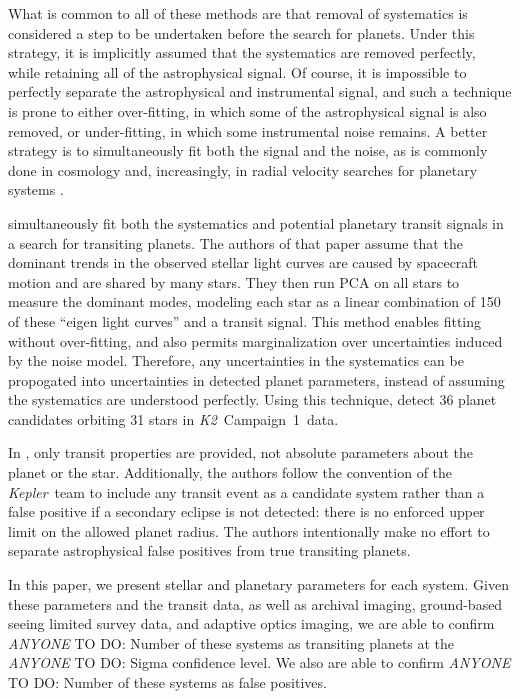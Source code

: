 \documentclass{emulateapj}
\newcommand{\project}[1]{\textsl{#1}}
\newcommand{\kep}{\project{Kepler}}
\newcommand{\KT}{\project{K2}}
\newcommand{\Ci}{Campaign~1}
\newcommand{\paperit}{\citet{Foreman-Mackey15}}
\newcommand{\todo}[3]{{\color{#2} \emph{#1} TO DO: #3}}
\newcommand{\anytodo}[1]{\todo{ANYONE}{NavyBlue}{#1}}
\begin{document}
What is common to all of these methods are that removal of systematics is considered a
step to be undertaken before the search for planets.
Under this strategy, it is implicitly assumed that the systematics are removed perfectly,
while retaining all of the astrophysical signal.
Of course, it is impossible to perfectly separate the astrophysical and instrumental
signal, and such a technique is prone to either over-fitting, in which some of the
astrophysical signal is also removed, or under-fitting, in which some instrumental noise
remains.
A better strategy is to simultaneously fit both the signal and the noise, as is commonly
done in cosmology and, increasingly, in radial velocity searches for planetary systems
\citep[e.g.][]{Ferreira00, Boisse11, Haywood14, Grunblatt15}.

\paperit{} simultaneously fit both the systematics and potential planetary transit signals
in a search for transiting planets.
The authors of that paper assume that the dominant trends in the observed stellar light
curves are caused by spacecraft motion and are shared by many stars.
They then run PCA on all stars to measure the dominant modes, modeling each star as a
linear combination of 150 of these ``eigen light curves'' and a transit signal.
This method enables fitting without over-fitting, and also permits marginalization over
uncertainties induced by the noise model.
Therefore, any uncertainties in the systematics can be propogated into uncertainties in
detected planet parameters, instead of assuming the systematics are understood perfectly.
Using this technique, \paperit{} detect 36 planet candidates orbiting 31 stars in \KT\
\Ci\ data.

In \paperit, only transit properties are provided, not absolute parameters about the
planet or the star.
Additionally, the authors follow the convention of the \kep\ team to include any
transit event as a candidate system rather than a false positive if a secondary eclipse
is not detected: there is no enforced upper limit on the allowed planet radius.
The authors intentionally make no effort to separate astrophysical false positives from
true transiting planets.

In this paper, we present stellar and planetary parameters for each system.
Given these parameters and the transit data, as well as archival imaging, ground-based
seeing limited survey data, and adaptive optics imaging, we are able to confirm
\anytodo{Number} of these systems as transiting planets at the \anytodo{Sigma} confidence
level. We also are able to confirm \anytodo{Number} of these systems as false positives.
\end{document}
